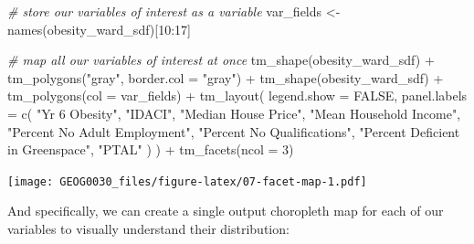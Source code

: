 \documentclass[
]{book}
\newenvironment{Shaded}{\begin{snugshade}}{\end{snugshade}}
\newcommand{\AttributeTok}[1]{\textcolor[rgb]{0.77,0.63,0.00}{#1}}
\newcommand{\CommentTok}[1]{\textcolor[rgb]{0.56,0.35,0.01}{\textit{#1}}}
\newcommand{\ConstantTok}[1]{\textcolor[rgb]{0.00,0.00,0.00}{#1}}
\newcommand{\DecValTok}[1]{\textcolor[rgb]{0.00,0.00,0.81}{#1}}
\newcommand{\FunctionTok}[1]{\textcolor[rgb]{0.00,0.00,0.00}{#1}}
\newcommand{\NormalTok}[1]{#1}
\newcommand{\OtherTok}[1]{\textcolor[rgb]{0.56,0.35,0.01}{#1}}
\newcommand{\SpecialCharTok}[1]{\textcolor[rgb]{0.00,0.00,0.00}{#1}}
\newcommand{\StringTok}[1]{\textcolor[rgb]{0.31,0.60,0.02}{#1}}
\begin{document}
\begin{Shaded}
\begin{Highlighting}[]
\CommentTok{\# store our variables of interest as a variable}
\NormalTok{var\_fields }\OtherTok{\textless{}{-}} \FunctionTok{names}\NormalTok{(obesity\_ward\_sdf)[}\DecValTok{10}\SpecialCharTok{:}\DecValTok{17}\NormalTok{]}

\CommentTok{\# map all our variables of interest at once}
\FunctionTok{tm\_shape}\NormalTok{(obesity\_ward\_sdf) }\SpecialCharTok{+}
  \FunctionTok{tm\_polygons}\NormalTok{(}\StringTok{"gray"}\NormalTok{, }\AttributeTok{border.col =} \StringTok{"gray"}\NormalTok{) }\SpecialCharTok{+}
  \FunctionTok{tm\_shape}\NormalTok{(obesity\_ward\_sdf) }\SpecialCharTok{+}
  \FunctionTok{tm\_polygons}\NormalTok{(}\AttributeTok{col =}\NormalTok{ var\_fields) }\SpecialCharTok{+}
  \FunctionTok{tm\_layout}\NormalTok{(}
    \AttributeTok{legend.show =} \ConstantTok{FALSE}\NormalTok{,}
    \AttributeTok{panel.labels =} \FunctionTok{c}\NormalTok{(}
      \StringTok{"Yr 6 Obesity"}\NormalTok{, }\StringTok{"IDACI"}\NormalTok{, }\StringTok{"Median House Price"}\NormalTok{,}
      \StringTok{"Mean Household Income"}\NormalTok{, }\StringTok{"Percent No Adult Employment"}\NormalTok{,}
      \StringTok{"Percent No Qualifications"}\NormalTok{, }\StringTok{"Percent Deficient in Greenspace"}\NormalTok{,}
      \StringTok{"PTAL"}
\NormalTok{    )}
\NormalTok{  ) }\SpecialCharTok{+}
  \FunctionTok{tm\_facets}\NormalTok{(}\AttributeTok{ncol =} \DecValTok{3}\NormalTok{)}
\end{Highlighting}
\end{Shaded}

\texttt{[image: GEOG0030\_files/figure-latex/07-facet-map-1.pdf]}

And specifically, we can create a single output choropleth map for each of our variables to visually understand their distribution:
\end{document}
